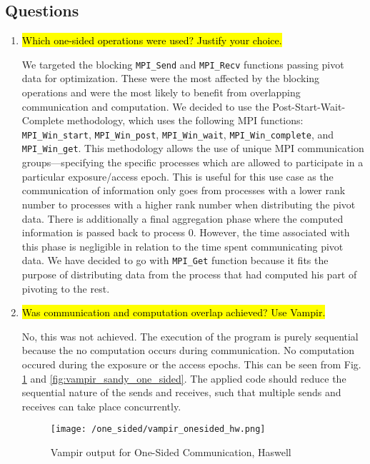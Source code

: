 \subsection{Questions}
\begin{enumerate}
  \item \hl{Which one-sided operations were used? Justify your choice.}

	We targeted the blocking \verb!MPI_Send! and \verb!MPI_Recv! functions passing pivot data for optimization.
	These were the most affected by the blocking operations and were the most likely to benefit from overlapping communication and computation.
    We decided to use the Post-Start-Wait-Complete methodology, which uses the following 
    MPI functions: \verb!MPI_Win_start!, \verb!MPI_Win_post!, \verb!MPI_Win_wait!, \verb!MPI_Win_complete!, and \verb!MPI_Win_get!. 
    This methodology allows the use of unique MPI communication groups---specifying the specific processes which are allowed to participate in a particular exposure/access epoch.
    This is useful for this use case as the communication of information only goes from processes with a lower rank number to processes with a higher rank number when distributing the pivot data.
    There is additionally a final aggregation phase where the computed information is passed back to process 0.
    However, the time associated with this phase is negligible in relation to the time spent communicating pivot data.
    We have decided to go with \verb!MPI_Get! function because it fits the purpose of distributing
    data from the process that had computed his part of pivoting to the rest.

  \item \hl{Was communication and computation overlap achieved? Use Vampir.}

    No, this was not achieved. 
    The execution of the program is purely sequential because the no computation occurs during communication.
    No computation occured during the exposure or the access epochs.
    This can be seen from Fig. \ref{fig:vampir_haswell_one_sided} and \ref{fig:vampir_sandy_one_sided}.
    The applied code should reduce the sequential nature of the sends and receives, such that multiple sends and receives can take place concurrently.
    \begin{figure}[h] %
	\begin{center}
			\texttt{[image: /one\_sided/vampir\_onesided\_hw.png]}
		\caption{Vampir output for One-Sided Communication, Haswell}
		\label{fig:vampir_haswell_one_sided}
	\end{center}
	\end{figure}
	

\end{enumerate}
